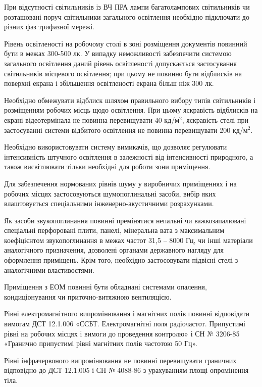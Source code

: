 \documentclass[simple,a4paper,14pt,ukrainian,utf8]{eskdtext}
\begin{document}
\begin{appendices}
                При відсутності світильників із ВЧ ПРА лампи багатолампових світильників чи розташовані поруч світильники загального освітлення необхідно підключати до різних фаз трифазної мережі.

                Рівень освітленості на робочому столі в зоні розміщення документів повинний бути в межах 300-500 лк. У випадку неможливості забезпечити системою загального освітлення даний рівень освітленості допускається застосування світильників місцевого освітлення; при цьому не повинно бути відблисків на поверхні екрана і збільшення освітленості екрана більш ніж 300 лк.

                Необхідно обмежувати відблиск шляхом правильного вибору типів світильників і розміщенням робочих місць щодо освітлення. При цьому яскравість відблисків на екрані відеотермінала не повинна  перевищувати 40 кд/м$^{2}$, яскравість стелі при застосуванні системи відбитого освітлення не повинна перевищувати 200 кд/м$^{2}$.

                Необхідно використовувати систему вимикачів, що дозволяє регулювати інтенсивність штучного освітлення в залежності від інтенсивності природного, а також висвітлювати тільки необхідні для роботи зони приміщення.

                Для забезпечення нормованих рівнів шуму у виробничих приміщеннях і на робочих місцях застосовуються шумопоглинальні засоби, вибір яких влаштовується спеціальними інженерно-акустичними розрахунками.

                Як засоби звукопоглинання повинні премінятися непальні чи важкозапалювані спеціальні перфоровані плити, панелі, мінеральна вата з максимальним коефіцієнтом звукопоглинання в межах частот 31,5 -- 8000 Гц, чи інші матеріали аналогічного призначення, дозволені органами державного нагляду для оформлення приміщень. Крім того, необхідно застосовувати підвісні стелі з аналогічними властивостями.

                Приміщення з ЕОМ повинні бути обладнані системами опалення, кондиціонування чи приточно-витяжною вентиляцією.

                Рівні електромагнітного випромінювання і магнітних полів повинні відповідати вимогам ДСТ 12.1.006 «ССБТ. Електромагнітні поля радіочастот. Припустимі рівні на робочих місцях і вимоги до проведення контролю» і СН № 3206-85 «Гранично припустимі рівні магнітних полів частотою 50 Гц».

                Рівні інфрачервоного випромінювання не повинні перевищувати граничних відповідно до ДСТ 12.1.005 і СН № 4088-86 з урахуванням площі опромінення тіла.


\end{appendices}
\end{document}
